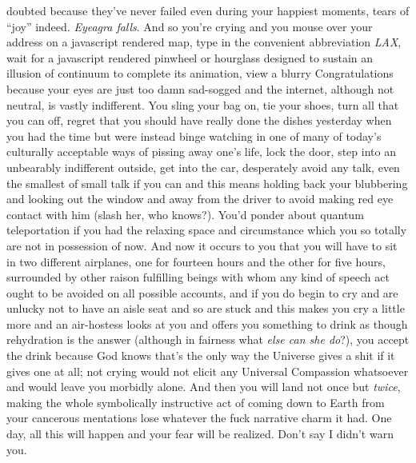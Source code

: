\documentclass{article}
\begin{document}
doubted because they've never failed even during your happiest moments,
tears of ``joy'' indeed. \textit{Eyeagra falls}. And so you're crying
and you mouse over your address on a javascript rendered map, type in
the convenient abbreviation \textit{LAX}, wait for a javascript rendered
pinwheel or hourglass designed to sustain an illusion of continuum to
complete its animation, view a blurry Congratulations because your eyes
are just too damn sad-sogged and the internet, although not neutral, is
vastly indifferent. You sling your bag on, tie your shoes, turn all that
you can off, regret that you should have really done the dishes
yesterday when you had the time but were instead binge watching in one
of many of today's culturally acceptable ways of pissing away one's
life, lock the door, step into an unbearably indifferent outside, get
into the car, desperately avoid any talk, even the smallest of small
talk if you can and this means holding back your blubbering and looking
out the window and away from the driver to avoid making red eye contact
with him (slash her, who knows?). You'd ponder about quantum
teleportation if you had the relaxing space and circumstance which you
so totally are not in possession of now. And now it occurs to you that
you will have to sit in two different airplanes, one for fourteen hours
and the other for five hours, surrounded by other raison fulfilling
beings with whom any kind of speech act ought to be avoided on all
possible accounts, and if you do begin to cry and are unlucky not to
have an aisle seat and so are stuck and this makes you cry a little more
and an air-hostess looks at you and offers you something to drink as
though rehydration is the answer (although in fairness what \textit{else
can she do}?), you accept the drink because God knows that's the only
way the Universe gives a shit if it gives one at all; not crying would
not elicit any Universal Compassion whatsoever and would leave you
morbidly alone. And then you will land not once but \textit{twice},
making the whole symbolically instructive act of coming down to Earth
from your cancerous mentations lose whatever the fuck narrative charm it
had. One day, all this will happen and your fear will be realized. Don't
say I didn't warn you.
\end{document}
